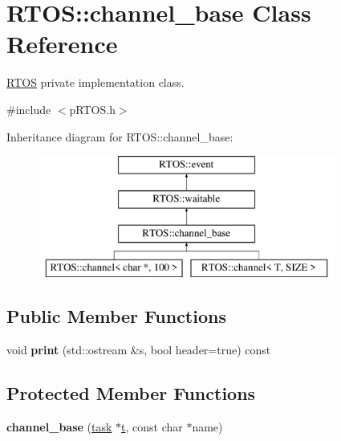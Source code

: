 \hypertarget{class_r_t_o_s_1_1channel__base}{}\section{R\+T\+OS\+:\+:channel\+\_\+base Class Reference}
\label{class_r_t_o_s_1_1channel__base}


\hyperlink{class_r_t_o_s}{R\+T\+OS} private implementation class.  




{\ttfamily \#include $<$p\+R\+T\+O\+S.\+h$>$}

Inheritance diagram for R\+T\+OS\+:\+:channel\+\_\+base\+:\begin{figure}[H]
\begin{center}
\leavevmode
\includegraphics[height=4.000000cm]{class_r_t_o_s_1_1channel__base}
\end{center}
\end{figure}
\subsection*{Public Member Functions}
\begin{DoxyCompactItemize}
\item 
void {\bfseries print} (std\+::ostream \&s, bool header=true) const \hypertarget{class_r_t_o_s_1_1channel__base_a8aecf8b9c2f96a8bf9b9f42c973a8195}{}\label{class_r_t_o_s_1_1channel__base_a8aecf8b9c2f96a8bf9b9f42c973a8195}

\end{DoxyCompactItemize}
\subsection*{Protected Member Functions}
\begin{DoxyCompactItemize}
\item 
{\bfseries channel\+\_\+base} (\hyperlink{class_r_t_o_s_1_1task}{task} $\ast$\hyperlink{class_r_t_o_s_1_1event_a1402687edb26c1d5d26e54dbda21919d}{t}, const char $\ast$name)\hypertarget{class_r_t_o_s_1_1channel__base_ac0624c73bb8e1bf12baf944aaf70ee81}{}\label{class_r_t_o_s_1_1channel__base_ac0624c73bb8e1bf12baf944aaf70ee81}

\end{DoxyCompactItemize}
